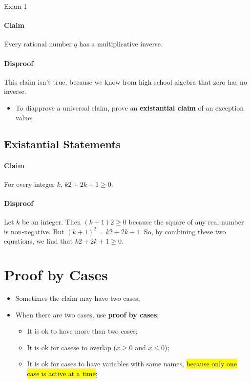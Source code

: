 \documentclass{note}
\begin{document}
\begin{note}{Exam 1}
        \paragraph{Claim} Every rational number $ q $ has a multiplicative inverse.
        \paragraph{Disproof} This claim isn’t true, because we know from high school algebra that zero has no inverse.
        \begin{itemize}
            \item To diapprove a universal claim, prove an \textbf{existantial claim} of an exception value;
        \end{itemize}

        \subsection{Existantial Statements}

        \paragraph{Claim}For every integer $ k $, $ k2 +2k+1≥0 $.
        \paragraph{Disproof} Let $ k $ be an integer. Then $ (k + 1)2 \geq 0 $ 
        because the square of any real number is non-negative. But $ (k+1)^{2} = k2 +2k+1 $. 
        So, by combining these two equations, we find that $ k2 + 2k + 1 \geq 0 $.

        \section{Proof by Cases}

        \begin{itemize}
            \item Sometimes the claim may have two cases;
            \item When there are two cases, use \textbf{proof by cases};
            \begin{itemize}
                \item It is ok to have more than two cases;
                \item It is ok for casese to overlap ($ x \geq 0 $ and $ x \leq 0 $);
                \item It is ok for cases to have variables with same names, \hl{because only
                one case is active at a time};
            \end{itemize}
        \end{itemize}


\end{note}
\end{document}
